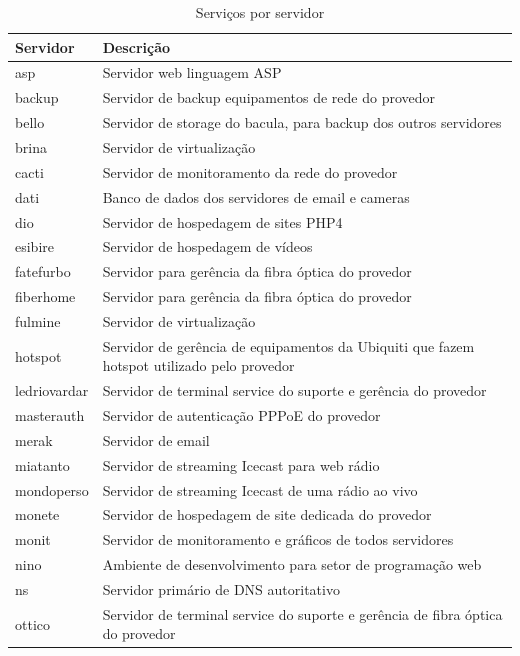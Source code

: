 \begin{table}
\caption {Serviços por servidor}
\label{tab:servporservidor}
\begin{center}
\begin{tabular}{|l|p{12cm}|}\hline
Servidor & Descrição\\\hline
asp & Servidor web linguagem ASP\\\hline
backup & Servidor de backup equipamentos de rede do provedor\\\hline
bello & Servidor de storage do bacula, para backup dos outros servidores\\\hline
brina & Servidor de virtualização\\\hline
cacti & Servidor de monitoramento da rede do provedor\\\hline
dati & Banco de dados dos servidores de email e cameras\\\hline
dio & Servidor de hospedagem de sites PHP4\\\hline
esibire & Servidor de hospedagem de vídeos\\\hline
fatefurbo & Servidor para gerência da fibra óptica do provedor\\\hline
fiberhome & Servidor para gerência da fibra óptica do provedor\\\hline
fulmine & Servidor de virtualização\\\hline
hotspot & Servidor de gerência de equipamentos da Ubiquiti que fazem hotspot utilizado pelo provedor\\\hline
ledriovardar & Servidor de terminal service do suporte e gerência do provedor\\\hline
masterauth & Servidor de autenticação PPPoE do provedor\\\hline
merak & Servidor de email\\\hline
miatanto & Servidor de streaming Icecast para web rádio\\\hline
mondoperso & Servidor de streaming Icecast de uma rádio ao vivo\\\hline
monete & Servidor de hospedagem de site dedicada do provedor\\\hline
monit & Servidor de monitoramento e gráficos de todos servidores\\\hline
nino & Ambiente de desenvolvimento para setor de programação web\\\hline
ns & Servidor primário de DNS autoritativo\\\hline
ottico & Servidor de terminal service do suporte e gerência de fibra óptica do provedor\\\hline

\end{tabular}
\end{center}
\end{table}
